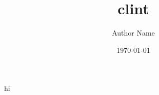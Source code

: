 \documentclass{article}
\title{clint}
\author{Author Name}
\date{\today}
\begin{document}
\maketitle

hi
\end{document}
